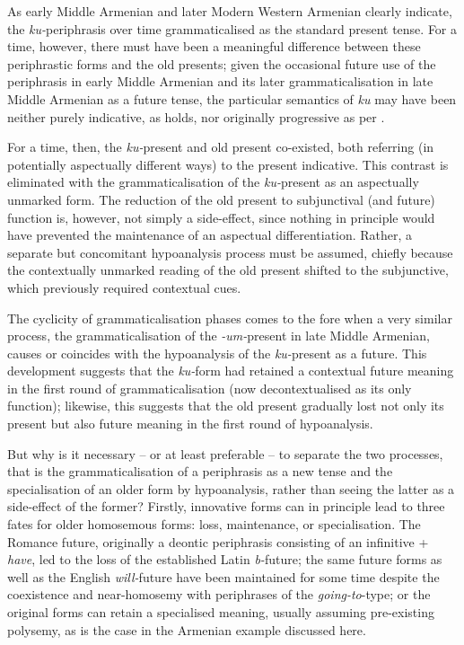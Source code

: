 \documentclass[output=paper,colorlinks,citecolor=brown]{langscibook}
\begin{document}
\largerpage[1.5]

As early Middle Armenian and later Modern Western Armenian clearly indicate, the \textit{ku-}periphrasis over time grammaticalised as the standard present tense. For a time, however, there must have been a meaningful difference between these periphrastic forms and the old presents; given the occasional future use of the periphrasis in early Middle Armenian and its later grammaticalisation in late Middle Armenian as a future tense, the particular semantics of \textit{ku} may have been neither purely indicative, as \citet{Karst1901} holds, nor originally progressive as per \citet{Vaux1995}.

For a time, then, the \textit{ku-}present and old present co-existed, both referring (in potentially aspectually different ways) to the present indicative. This contrast is eliminated with the grammaticalisation of the \textit{ku-}present as an aspectually unmarked form. The reduction of the old present to subjunctival (and future) function is, however, not simply a side-effect, since nothing in principle would have prevented the maintenance of an aspectual differentiation. Rather, 
a separate but concomitant hypoanalysis process must be assumed, chiefly because the contextually unmarked reading of the old present shifted to the subjunctive, which previously required contextual cues.

The cyclicity of grammaticalisation phases comes to the fore when a very similar process, the grammaticalisation of the \textit{-um-}present in late Middle Armenian, causes or coincides with the hypoanalysis of the \textit{ku-}present as a future. This development suggests that the \textit{ku-}form had retained a contextual future meaning in the first round of grammaticalisation (now decontextualised as its only function); likewise, this suggests that the old present gradually lost not only its present but also future meaning in the first round of hypoanalysis.

But why is it necessary – or at least preferable – to separate the two processes, that is the grammaticalisation of a periphrasis as a new tense and the specialisation of an older form by hypoanalysis, rather than seeing the latter as a side-effect of the former? Firstly, innovative forms can in principle lead to three fates for older homosemous forms: loss, maintenance, or specialisation. The Romance future, originally a deontic periphrasis consisting of an infinitive + \textit{have}, led to the loss of the established Latin \textit{b-}future; the same future forms as well as the English \textit{will-}future have been maintained for some time despite the coexistence and near-homosemy with periphrases of the \textit{going-to}-type; or the original forms can retain a specialised meaning, usually assuming pre-existing polysemy, as is the case in the Armenian example discussed here.
\end{document}
